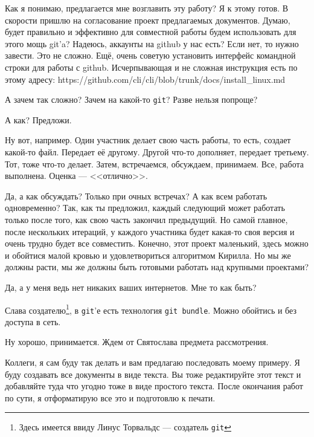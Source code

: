 \documentclass[14pt,a4paper]{article}
\begin{document}
 Как я понимаю, предлагается мне возглавить эту работу? Я к этому готов. В скорости
пришлю на согласование проект предлагаемых документов. Думаю, будет правильно и эффективно
для совместной работы будем использовать для этого мощь git'a? Надеюсь, аккаунты на github у нас есть?
Если нет, то нужно завести. Это не сложно. Ещё, очень советую установить интерфейс командной
строки для работы с github. Исчерпывающая и не сложная инструкция есть по этому адресу:
https://github.com/cli/cli/blob/trunk/docs/install\_linux.md

 А зачем так сложно? Зачем на какой-то \texttt{git}? Разве нельзя попроще?

 А как? Предложи.

 Ну вот, например. Один участник делает свою часть работы, то есть, создает какой-то файл.
Передает её другому. Другой что-то дополняет, передает третьему. Тот, тоже что-то делает. Затем,
встречаемся, обсуждаем, принимаем. Все, работа выполнена. Оценка --- <<отлично>>.

 Да, а как обсуждать? Только при очных встречах? А как всем работать одновременно? Так, 
как ты предложил, каждый следующий может работать только после того, как свою часть закончил предыдущий.
Но самой главное, после нескольких итераций, у каждого участника будет какая-то своя версия и очень трудно
будет все совместить. Конечно, этот проект маленький, здесь можно и обойтися малой кровью и удовлетвориться
алгоритмом Кирилла. Но мы же должны расти, мы же должны быть готовыми работать над  крупными проектами?

 Да, а у меня ведь нет никаких ваших интернетов. Мне то как быть?

 Слава создателю\footnote{Здесь имеется ввиду Линус Торвальдс --- создатель \texttt{git}}, в \texttt{git}'е есть технология \texttt{git bundle}. Можно обойтись 
и без доступа в сеть. 

 Ну хорошо, принимается. Ждем от Святослава предмета рассмотрения. 

 Коллеги, я сам буду так делать и вам предлагаю последовать моему примеру. Я буду
создавать все документы в виде текста. Вы тоже редактируйте этот текст и добавляйте туда что угодно
тоже в виде простого текста. После окончания работ по сути, я отформатирую все это и подготовлю к 
печати. 
\end{document}
